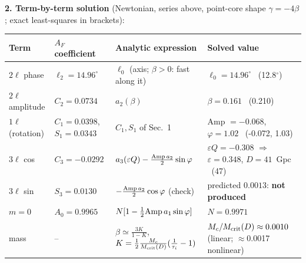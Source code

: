 \documentclass[10pt]{article}
\begin{document}
{\textbf{2. Term-by-term solution} (Newtonian, series above, point-core shape $\gamma=-4\beta$; exact least-squares in brackets):
\begin{center}\footnotesize\setlength{\tabcolsep}{3pt}\begin{tabular}{llll}\toprule
Term & $A_F$ coefficient & Analytic expression & Solved value\\\midrule
$2\ell$ phase & $\ell_2=14.96^\circ$ & $\ell_0$ (axis; $\beta>0$: fast along it) & $\ell_0=14.96^\circ$ \ (12.8$^\circ$)\\
$2\ell$ amplitude & $C_2=0.0734$ & $a_2(\beta)$ & $\beta=0.161$ \ (0.210)\\
$1\ell$ (rotation) & $C_1=0.0398$, $S_1=0.0343$ & $C_1,S_1$ of Sec.~1 & Amp $=-0.068$, $\varphi=1.02$ \ (-0.072, 1.03)\\
$3\ell$ cos & $C_3=-0.0292$ & $a_3(\varepsilon Q)-\frac{{\rm Amp}\,a_2}2\sin\varphi$ & $\varepsilon Q=-0.308$ $\Rightarrow$ $\varepsilon=0.348$, $D=41$~Gpc \ (47)\\
$3\ell$ sin & $S_3=0.0130$ & $-\frac{{\rm Amp}\,a_2}2\cos\varphi$ (check) & predicted $0.0013$: \textbf{not produced}\\
$m=0$ & $A_0=0.9965$ & $N[1-\frac12{\rm Amp}\,a_1\sin\varphi]$ & $N=0.9971$\\\midrule
mass & -- & $\beta\simeq\frac{3K}{1-K}$, $K=\frac12\frac{M_c}{M_{\rm crit}(D)}(\frac1{\tau_i}-1)$ & $M_c/M_{\rm crit}(D)\approx0.0010$ (linear; $\approx$0.0017 nonlinear)\\\bottomrule
\end{tabular}\end{center}
}
\end{document}
